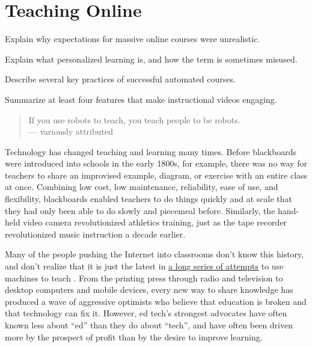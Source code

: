 \chapter{Teaching Online}\label{s:online}

\begin{objectives}

\item
  Explain why expectations for massive online courses were
  unrealistic.

\item
  Explain what personalized learning is, and how the term is sometimes
  misused.

\item
  Describe several key practices of successful automated courses.

\item
  Summarize at least four features that make instructional videos
  engaging.

\end{objectives}

\begin{quote}

  If you use robots to teach, you teach people to be robots.\\
  --- variously attributed

\end{quote}

Technology has changed teaching and learning many times.  Before
blackboards were introduced into schools in the early 1800s, for
example, there was no way for teachers to share an improvised example,
diagram, or exercise with an entire class at once.  Combining low
cost, low maintenance, reliability, ease of use, and flexibility,
blackboards enabled teachers to do things quickly and at scale that
they had only been able to do slowly and piecemeal before.  Similarly,
the hand-held video camera revolutionized athletics training, just as
the tape recorder revolutionized music instruction a decade earlier.

Many of the people pushing the Internet into classrooms don't know
this history, and don't realize that it is just the latest in
\href{http://teachingmachin.es/timeline.html}{a long series of
  attempts} to use machines to teach \cite{Watt2014}.  From the
printing press through radio and television to desktop computers and
mobile devices, every new way to share knowledge has produced a wave
of aggressive optimists who believe that education is broken and that
technology can fix it.  However, ed tech's strongest advocates have
often known less about ``ed'' than they do about ``tech'', and have
often been driven more by the prospect of profit than by the desire to
improve learning.

